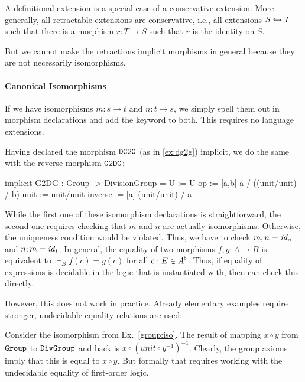 \begin{remark}
A definitional extension is a special case of a conservative extension.
More generally, all retractable extensions are conservative, i.e., all extensions $S\hookrightarrow T$ such that there is a morphism $r:T\to S$ such that $r$ is the identity on $S$.

But we cannot make the retractions implicit morphisms in general because they are not necessarily isomorphisms.
\end{remark}

\paragraph{Canonical Isomorphisms}
If we have isomorphisms $m:s\to t$ and $n:t\to s$, we simply spell them out in morphism declarations and add the keyword  to both.
This requires no language extensions.

\begin{example}\label{group:iso}
Having declared the morphism $\operatorname{\mathtt{DG2G}}$ (as in \autoref{ex:dg2g}) implicit, we do the same with the reverse morphism  $\operatorname{\mathtt{G2DG}}$:
\begin{mmtcode}
implicit G2DG : Group -> DivisionGroup =
  U := U
  op := [a,b] a / ((unit/unit) / b) 
  unit := unit/unit
  inverse := [a] (unit/unit) / a
\end{mmtcode}
\end{example}

While the first one of these isomorphism declarations is straightforward, the second one requires checking that $m$ and $n$ are actually isomorphisms.
Otherwise, the uniqueness condition would be violated.
Thus, we have to check $m;n=\mathit{id}_{s}$ and $n;m=\mathit{id}_{t}$.
In general, the equality of two morphisms $f,g:A\to B$ is equivalent to $\vdash_B f(c)=g(c)$ for all $c:E\in A^\flat$.
Thus, if equality of expressions is decidable in the logic that \mmt is instantiated with, then \mmt can check this directly.

However, this does not work in practice.
Already elementary examples require stronger, undecidable equality relations are used:

\begin{example}
Consider the isomorphism from Ex.~\ref{group:iso}.
The result of mapping $x\circ y$ from $\operatorname{\mathtt{Group}}$ to $\operatorname{\mathtt{DivGroup}}$ and back is $x\circ(unit\circ y^{-1})^{-1}$.
Clearly, the group axioms imply that this is equal to $x\circ y$.
But formally that requires working with the undecidable equality of first-order logic.
\end{example}

